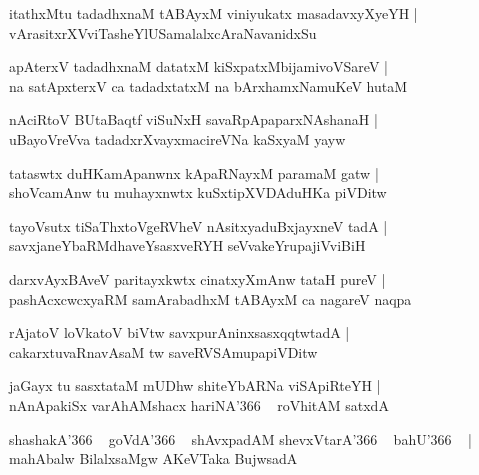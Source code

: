 \documentclass[twoside,12pt,openright]{book}
\newcounter{shloka}[chapter]
\begin{document}
\begin{shloka}
itathxMtu tadadhxnaM tABAyxM viniyukatx masadavxyXyeYH |\\
vArasitxrXVviTasheYlUSamalalxcAraNavanidxSu 
\end{shloka}

\begin{shloka}
apAterxV tadadhxnaM datatxM kiSxpatxMbijamivoVSareV |\\
na satApxterxV ca tadadxtatxM na bArxhamxNamuKeV hutaM 
\end{shloka}

\begin{shloka}
nAciRtoV BUtaBaqtf viSuNxH savaRpApaparxNAshanaH |\\
uBayoVreVva tadadxrXvayxmacireVNa kaSxyaM yayw 
\end{shloka}

\begin{shloka}
tataswtx duHKamApanwnx kApaRNayxM paramaM gatw |\\
shoVcamAnw tu muhayxnwtx kuSxtipXVDAduHKa piVDitw 
\end{shloka}

\begin{shloka}
tayoVsutx tiSaThxtoVgeRVheV nAsitxyaduBxjayxneV  tadA |\\
savxjaneYbaRMdhaveYsasxveRYH seVvakeYrupajiVviBiH 
\end{shloka}

\begin{shloka}
darxvAyxBAveV paritayxkwtx cinatxyXmAnw tataH pureV |\\
pashAcxcwcxyaRM samArabadhxM tABAyxM ca nagareV naqpa 
\end{shloka}

\begin{shloka}
rAjatoV loVkatoV biVtw savxpurAninxsasxqqtwtadA |\\
cakarxtuvaRnavAsaM tw saveRVSAmupapiVDitw
\end{shloka}

\begin{shloka}
jaGayx tu sasxtataM mUDhw shiteYbARNa viSApiRteYH |\\
nAnApakiSx varAhAMshacx hariNA\char'366 ~ roVhitAM satxdA 
\end{shloka}

\begin{shloka}
shashakA\char'366 ~ goVdA\char'366 ~ shAvxpadAM shevxVtarA\char'366 ~ bahU\char'366 ~ |\\
mahAbalw BilalxsaMgw AKeVTaka BujwsadA 
\end{shloka}
\end{document}
